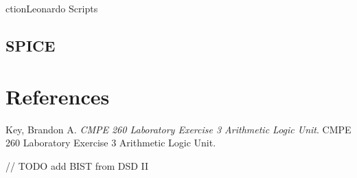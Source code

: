 \documentclass[11pt]{article}
\begin{document}
ction{Leonardo Scripts}
		

	\subsection{SPICE}

		
\section{References}

	Key, Brandon A. \textit{CMPE 260 Laboratory Exercise 3 Arithmetic Logic Unit}. CMPE 260 Laboratory Exercise 3 Arithmetic Logic Unit.
	
	// TODO add BIST from DSD II
\end{document}
